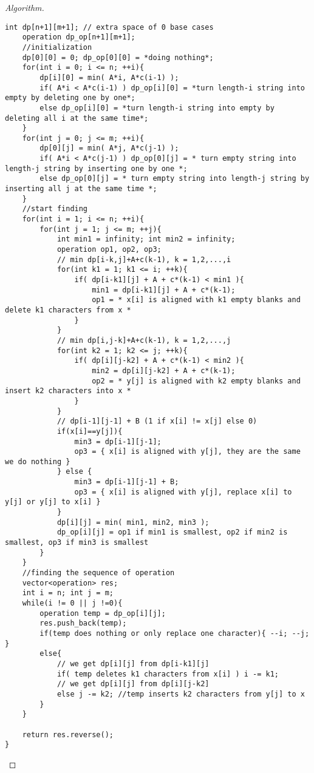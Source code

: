 \documentclass[openany]{article}
\begin{document}
\begin{proof}[Algorithm]{}
\begin{lstlisting}[basicstyle=\fontsize{8}{9}\selectfont\ttfamily]
    int dp[n+1][m+1]; // extra space of 0 base cases
    operation dp_op[n+1][m+1];
    //initialization
    dp[0][0] = 0; dp_op[0][0] = *doing nothing*;
    for(int i = 0; i <= n; ++i){
        dp[i][0] = min( A*i, A*c(i-1) );
        if( A*i < A*c(i-1) ) dp_op[i][0] = *turn length-i string into empty by deleting one by one*;
        else dp_op[i][0] = *turn length-i string into empty by deleting all i at the same time*;
    }
    for(int j = 0; j <= m; ++i){
        dp[0][j] = min( A*j, A*c(j-1) );
        if( A*i < A*c(j-1) ) dp_op[0][j] = * turn empty string into length-j string by inserting one by one *;
        else dp_op[0][j] = * turn empty string into length-j string by inserting all j at the same time *;
    }
    //start finding
    for(int i = 1; i <= n; ++i){
        for(int j = 1; j <= m; ++j){
            int min1 = infinity; int min2 = infinity;
            operation op1, op2, op3;
            // min dp[i-k,j]+A+c(k-1), k = 1,2,...,i
            for(int k1 = 1; k1 <= i; ++k){
                if( dp[i-k1][j] + A + c*(k-1) < min1 ){
                    min1 = dp[i-k1][j] + A + c*(k-1);
                    op1 = * x[i] is aligned with k1 empty blanks and delete k1 characters from x *
                }
            }
            // min dp[i,j-k]+A+c(k-1), k = 1,2,...,j
            for(int k2 = 1; k2 <= j; ++k){
                if( dp[i][j-k2] + A + c*(k-1) < min2 ){
                    min2 = dp[i][j-k2] + A + c*(k-1);
                    op2 = * y[j] is aligned with k2 empty blanks and insert k2 characters into x *
                }
            }
            // dp[i-1][j-1] + B (1 if x[i] != x[j] else 0)
            if(x[i]==y[j]){
                min3 = dp[i-1][j-1];
                op3 = { x[i] is aligned with y[j], they are the same we do nothing }
            } else {
                min3 = dp[i-1][j-1] + B;
                op3 = { x[i] is aligned with y[j], replace x[i] to y[j] or y[j] to x[i] }
            }
            dp[i][j] = min( min1, min2, min3 );
            dp_op[i][j] = op1 if min1 is smallest, op2 if min2 is smallest, op3 if min3 is smallest
        }
    }
    //finding the sequence of operation
    vector<operation> res;
    int i = n; int j = m;
    while(i != 0 || j !=0){
        operation temp = dp_op[i][j];
        res.push_back(temp);
        if(temp does nothing or only replace one character){ --i; --j; }
        else{
            // we get dp[i][j] from dp[i-k1][j]
            if( temp deletes k1 characters from x[i] ) i -= k1;
            // we get dp[i][j] from dp[i][j-k2]
            else j -= k2; //temp inserts k2 characters from y[j] to x
        }
    }
    
    return res.reverse();
}
		\end{lstlisting} 
\end{proof}
\end{document}
